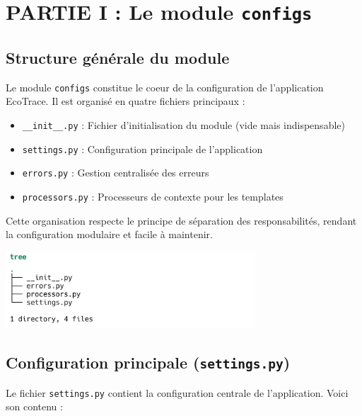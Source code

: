 \documentclass[a4paper,11pt]{article}
\begin{document}
    \newpage
    \section{PARTIE I : Le module \texttt{configs}}
        \subsection{Structure générale du module}
            \noindent Le module \texttt{configs} constitue le coeur de la configuration de l'application EcoTrace. Il est organisé en quatre fichiers principaux :
            
            \begin{itemize}
                \item \texttt{\_\_init\_\_.py} : Fichier d'initialisation du module (vide mais indispensable)
                \item \texttt{settings.py} : Configuration principale de l'application
                \item \texttt{errors.py} : Gestion centralisée des erreurs
                \item \texttt{processors.py} : Processeurs de contexte pour les templates
            \end{itemize}

            \noindent Cette organisation respecte le principe de séparation des responsabilités, rendant la configuration modulaire et facile à maintenir.

            \begin{center}
                \includegraphics[width=0.7\textwidth]{captures/configs/img1.png}
            \end{center}

        \subsection{Configuration principale (\texttt{settings.py})}
            \noindent Le fichier \texttt{settings.py} contient la configuration centrale de l'application. Voici son contenu :

            
\end{document}
